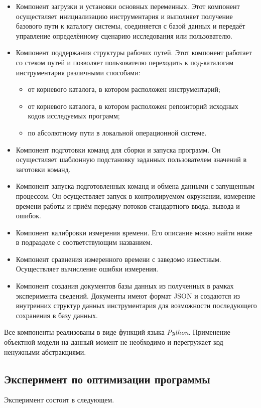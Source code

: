 \begin{itemize}
    \item Компонент загрузки и установки основных переменных. Этот компонент осуществляет инициализацию инструментария и выполняет получение базового пути к каталогу системы, соединяется с базой данных и передаёт управление определённому сценарию исследования или пользователю.
    \item Компонент поддержания структуры рабочих путей. Этот компонент работает со стеком путей и позволяет пользователю переходить к под-каталогам инструментария различными способами:
    \begin{itemize}
        \item от корневого каталога, в котором расположен инструментарий;
        \item от корневого каталога, в котором расположен репозиторий исходных кодов исследуемых программ;
        \item по абсолютному пути в локальной операционной системе.
    \end{itemize}
    \item Компонент подготовки команд для сборки и запуска программ. Он осуществляет шаблонную подстановку заданных пользователем значений в заготовки команд.
    \item Компонент запуска подготовленных команд и обмена данными с запущенным процессом. Он осуществляет запуск в контролируемом окружении, измерение времени работы и приём-передачу потоков стандартного ввода, вывода и ошибок.
    \item Компонент калибровки измерения времени. Его описание можно найти ниже в подразделе с соответствующим названием.
    \item Компонент сравнения измеренного времени с заведомо известным. Осуществляет вычисление ошибки измерения.
    \item Компонент создания документов базы данных из полученных в рамках эксперимента сведений. Документы имеют формат JSON \cite{json} и создаются из внутренних структур данных инструментария для возможности последующего сохранения в базу данных.
\end{itemize}

Все компоненты реализованы в виде функций языка \textit{Python}. Применение объектной модели на данный момент не необходимо и перегружает код ненужными абстракциями.


\subsection{Эксперимент по оптимизации программы}
Эксперимент состоит в следующем.

